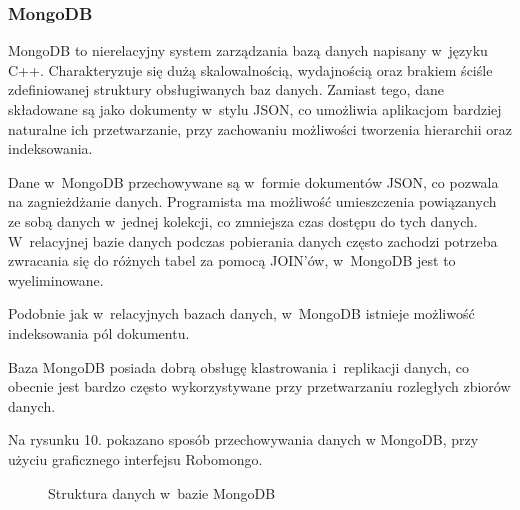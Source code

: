 \documentclass[12pt,a4paper,notitlepage]{article}
\begin{document}
\subsubsection{MongoDB}
MongoDB to nierelacyjny system zarządzania bazą danych napisany w~języku C++. Charakteryzuje się dużą skalowalnością, wydajnością oraz brakiem ściśle zdefiniowanej struktury obsługiwanych baz danych. Zamiast tego, dane składowane są jako dokumenty w~stylu JSON, co umożliwia aplikacjom bardziej naturalne ich przetwarzanie, przy zachowaniu możliwości tworzenia hierarchii oraz indeksowania.

\par Dane w~MongoDB przechowywane są w~formie dokumentów JSON, co pozwala na zagnieżdżanie danych. Programista ma możliwość umieszczenia powiązanych ze sobą danych w~jednej kolekcji, co zmniejsza czas dostępu do tych danych. W~relacyjnej bazie danych podczas pobierania danych często zachodzi potrzeba zwracania się do różnych tabel za pomocą JOIN'ów, w~MongoDB jest to wyeliminowane.

\par Podobnie jak w~relacyjnych bazach danych, w~MongoDB istnieje możliwość indeksowania pól dokumentu.

\par Baza MongoDB posiada dobrą obsługę klastrowania i~replikacji danych, co obecnie jest bardzo często wykorzystywane przy przetwarzaniu rozległych zbiorów danych.

\par Na rysunku 10. pokazano sposób przechowywania danych w MongoDB, przy użyciu graficznego interfejsu Robomongo.

\begin{figure}[H]
\begin{center}
\caption{Struktura danych w~bazie MongoDB}
\end{center}
\end{figure}
\end{document}
